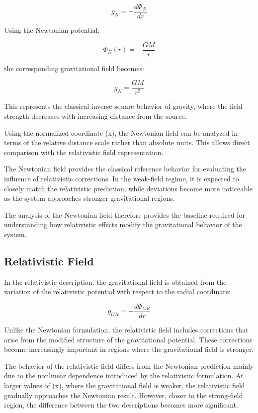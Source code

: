 \documentclass[
]{article}
\begin{document}
\[
g_N=-\frac{d\Phi_N}{dr}
\]

Using the Newtonian potential:

\[
\Phi_N(r)=-\frac{GM}{r}
\]

the corresponding gravitational field becomes:

\[
g_N=\frac{GM}{r^2}
\]

This represents the classical inverse-square behavior of gravity, where
the field strength decreases with increasing distance from the source.

Using the normalized coordinate (x), the Newtonian field can be analyzed
in terms of the relative distance scale rather than absolute units. This
allows direct comparison with the relativistic field representation.

The Newtonian field provides the classical reference behavior for
evaluating the influence of relativistic corrections. In the weak-field
regime, it is expected to closely match the relativistic prediction,
while deviations become more noticeable as the system approaches
stronger gravitational regions.

The analysis of the Newtonian field therefore provides the baseline
required for understanding how relativistic effects modify the
gravitational behavior of the system.

\subsection{Relativistic Field}\label{relativistic-field}

In the relativistic description, the gravitational field is obtained
from the variation of the relativistic potential with respect to the
radial coordinate:

\[
g_{GR}=-\frac{d\Phi_{GR}}{dr}
\]

Unlike the Newtonian formulation, the relativistic field includes
corrections that arise from the modified structure of the gravitational
potential. These corrections become increasingly important in regions
where the gravitational field is stronger.

The behavior of the relativistic field differs from the Newtonian
prediction mainly due to the nonlinear dependence introduced by the
relativistic formulation. At larger values of (x), where the
gravitational field is weaker, the relativistic field gradually
approaches the Newtonian result. However, closer to the strong-field
region, the difference between the two descriptions becomes more
significant.
\end{document}
